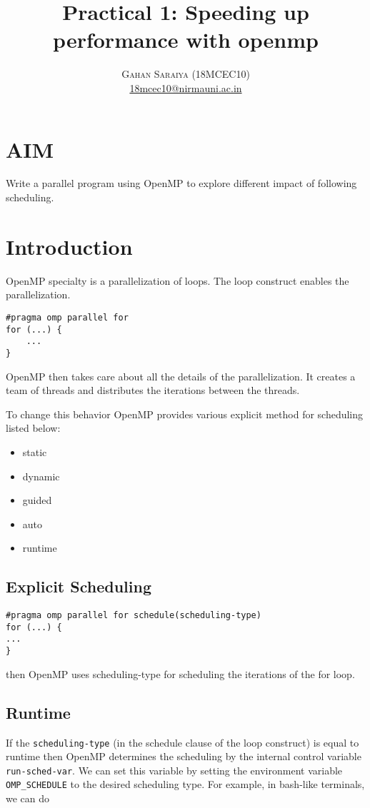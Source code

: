 \documentclass[paper=letter, fontsize=12pt]{article}
\title{\vspace{-15mm}\fontsize{24pt}{10pt}\selectfont\textbf{Practical 1: Speeding up performance with openmp}} %
\author{
\large
{\textsc{Gahan Saraiya (18MCEC10)}}\\[2mm]
\normalsize \href{mailto:18mcec10@nirmauni.ac.in}{18mcec10@nirmauni.ac.in}\\[2mm] %
}
\date{}
\begin{document}
\maketitle %
\thispagestyle{fancy} %

\section{AIM}
Write a parallel program using OpenMP to explore different impact of following scheduling. 

\section{Introduction}
OpenMP specialty is a parallelization of loops. The loop construct enables the parallelization.
\begin{verbatim}
#pragma omp parallel for
for (...) { 
    ... 
}
\end{verbatim}
OpenMP then takes care about all the details of the parallelization. It creates a team of threads and distributes the iterations between the threads.

To change this behavior OpenMP provides various explicit method for scheduling listed below:
\begin{itemize}
    \item static
    \item dynamic
    \item guided
    \item auto
    \item runtime
\end{itemize}

\subsection{Explicit Scheduling}
\begin{verbatim}
#pragma omp parallel for schedule(scheduling-type)
for (...) { 
... 
}
\end{verbatim}
then OpenMP uses scheduling-type for scheduling the iterations of the for loop.

\subsection{Runtime}
If the \verb|scheduling-type| (in the schedule clause of the loop construct) is equal to runtime then OpenMP determines the scheduling by the internal control variable \verb|run-sched-var|. We can set this variable by setting the environment variable \verb|OMP_SCHEDULE| to the desired scheduling type. For example, in bash-like terminals, we can do
\end{document}
